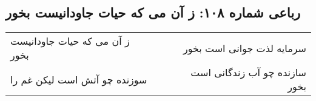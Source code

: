\begin{center}
\section*{رباعی شماره ۱۰۸: ز آن می که حیات جاودانیست بخور}
\label{sec:sh108}
\begin{longtable}{l p{0.5cm} r}
ز آن می که حیات جاودانیست بخور
&&
سرمایه لذت جوانی است بخور
\\
سوزنده چو آتش است لیکن غم را
&&
سازنده چو آب زندگانی است بخور
\\
\end{longtable}
\end{center}
